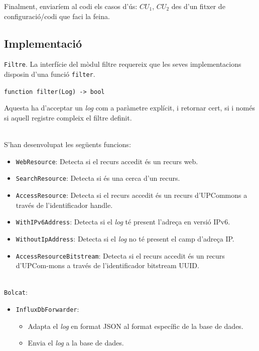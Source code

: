 \noindent
Finalment, enviaríem al codi els casos d’ús: \(CU_1\), \(CU_2\) des d'un fitxer de configuració/codi que faci la feina.

\clearpage

\subsection{Implementació}\label{subsec:log-implementation}

\noindent
\texttt{Filtre}.
La interfície del mòdul filtre requereix que les seves implementacions disposin d'una funció \texttt{filter}.
\begin{center}
    \texttt{function filter(Log) -> bool}
\end{center}
Aquesta ha d'acceptar un \textit{\gls{log}} com a paràmetre explícit, i retornar cert, si i només si aquell registre compleix el filtre definit.

\noindent \\
S'han desenvolupat les següents funcions:

\begin{itemize}
    \item \texttt{WebResource}: Detecta si el recurs accedit és un recurs web.
    \item \texttt{SearchResource}: Detecta si és una cerca d’un recurs.
    \item \texttt{AccessResource}: Detecta si el recurs accedit és un recurs d’\gls{UPCommons} a través de l'identificador \gls{handle}.
    \item \texttt{WithIPv6Address}: Detecta si el \textit{\gls{log}} té present l’adreça en versió IPv6.
    \item \texttt{WithoutIpAddress}: Detecta si el \textit{\gls{log}} no té present el camp d'adreça \gls{IP}.
    \item \texttt{AccessResourceBitstream}: Detecta si el recurs accedit és un recurs d’UPCom-mons a través de l'identificador \gls{bitstream} \gls{UUID}.
\end{itemize}

\noindent \\
\texttt{Bolcat}:
\begin{itemize}
    \item \texttt{InfluxDbForwarder}:
    \begin{itemize}
        \item Adapta el \textit{\gls{log}} en format JSON al format específic de la base de dades.
        \item Envia el \textit{\gls{log}} a la base de dades.
    \end{itemize}
\end{itemize}


